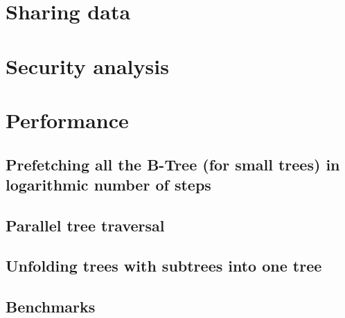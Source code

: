 \documentclass[notitlepage]{revtex4-1}
\begin{document}
\section{Sharing data}

\section{Security analysis}

\section{Performance}

\subsection{Prefetching all the B-Tree (for small trees) in logarithmic number of steps}

\subsection{Parallel tree traversal}

\subsection{Unfolding trees with subtrees into one tree}

\subsection{Benchmarks}


\end{document}
